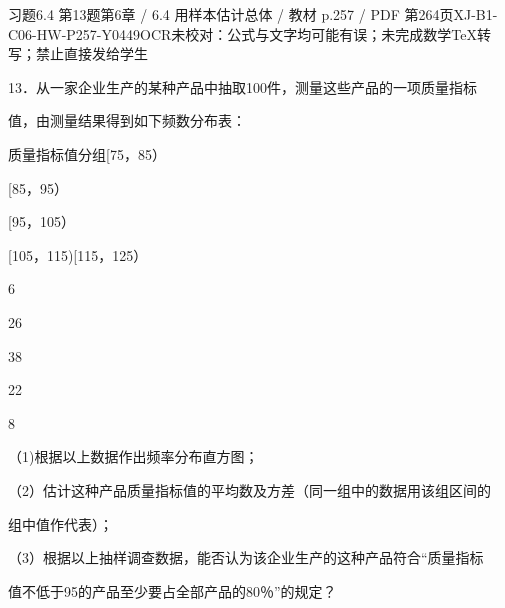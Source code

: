 \begin{bankitem}{习题6.4 第13题}{第6章 / 6.4 用样本估计总体 / 教材 p.257 / PDF 第264页}{XJ-B1-C06-HW-P257-Y0449}{OCR未校对：公式与文字均可能有误；未完成数学TeX转写；禁止直接发给学生}
\begin{ocrdraft}
\par
13．从一家企业生产的某种产品中抽取100件，测量这些产品的一项质量指标
\par
值，由测量结果得到如下频数分布表：
\par
质量指标值分组[75，85）
\par
[85，95）
\par
[95，105）
\par
[105，115)[115，125）
\par
6
\par
26
\par
38
\par
22
\par
8
\par
（1)根据以上数据作出频率分布直方图；
\par
（2）估计这种产品质量指标值的平均数及方差（同一组中的数据用该组区间的
\par
组中值作代表）；
\par
（3）根据以上抽样调查数据，能否认为该企业生产的这种产品符合“质量指标
\par
值不低于95的产品至少要占全部产品的80％”的规定？
\end{ocrdraft}
\end{bankitem}
